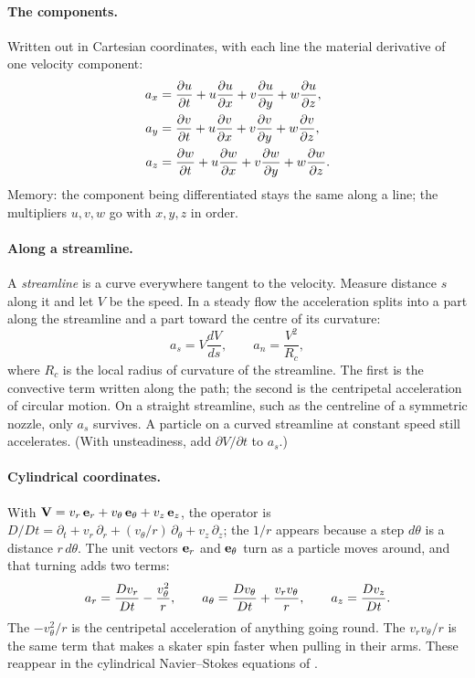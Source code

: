 \paragraph{The components.} Written out in Cartesian coordinates, with each line the material derivative of one velocity component:
\begin{align*}
a_x &= \frac{\partial u}{\partial t} + u\frac{\partial u}{\partial x} + v\frac{\partial u}{\partial y} + w\frac{\partial u}{\partial z}, \\
a_y &= \frac{\partial v}{\partial t} + u\frac{\partial v}{\partial x} + v\frac{\partial v}{\partial y} + w\frac{\partial v}{\partial z}, \\
a_z &= \frac{\partial w}{\partial t} + u\frac{\partial w}{\partial x} + v\frac{\partial w}{\partial y} + w\frac{\partial w}{\partial z}.
\end{align*}
Memory: the component being differentiated stays the same along a line; the multipliers $u, v, w$ go with $x, y, z$ in order.

\paragraph{Along a streamline.} A \emph{streamline} is a curve everywhere tangent to the velocity. Measure distance $s$ along it and let $V$ be the speed. In a steady flow the acceleration splits into a part along the streamline and a part toward the centre of its curvature:
\[
a_s = V\frac{dV}{ds}, \qquad a_n = \frac{V^2}{R_c},
\]
where $R_c$ is the local radius of curvature of the streamline. The first is the convective term written along the path; the second is the centripetal acceleration of circular motion. On a straight streamline, such as the centreline of a symmetric nozzle, only $a_s$ survives. A particle on a curved streamline at constant speed still accelerates. (With unsteadiness, add $\partial V/\partial t$ to $a_s$.)

\paragraph{Cylindrical coordinates.} With $\mathbf{V} = v_r\,\mathbf{e}_r + v_\theta\,\mathbf{e}_\theta + v_z\,\mathbf{e}_z$, the operator is $D/Dt = \partial_t + v_r\,\partial_r + (v_\theta/r)\,\partial_\theta + v_z\,\partial_z$; the $1/r$ appears because a step $d\theta$ is a distance $r\,d\theta$. The unit vectors $\mathbf{e}_r$ and $\mathbf{e}_\theta$ turn as a particle moves around, and that turning adds two terms:
\[
a_r = \frac{Dv_r}{Dt} - \frac{v_\theta^2}{r}, \qquad
a_\theta = \frac{Dv_\theta}{Dt} + \frac{v_r v_\theta}{r}, \qquad
a_z = \frac{Dv_z}{Dt}.
\]
The $-v_\theta^2/r$ is the centripetal acceleration of anything going round. The $v_r v_\theta/r$ is the same term that makes a skater spin faster when pulling in their arms. These reappear in the cylindrical Navier--Stokes equations of .

